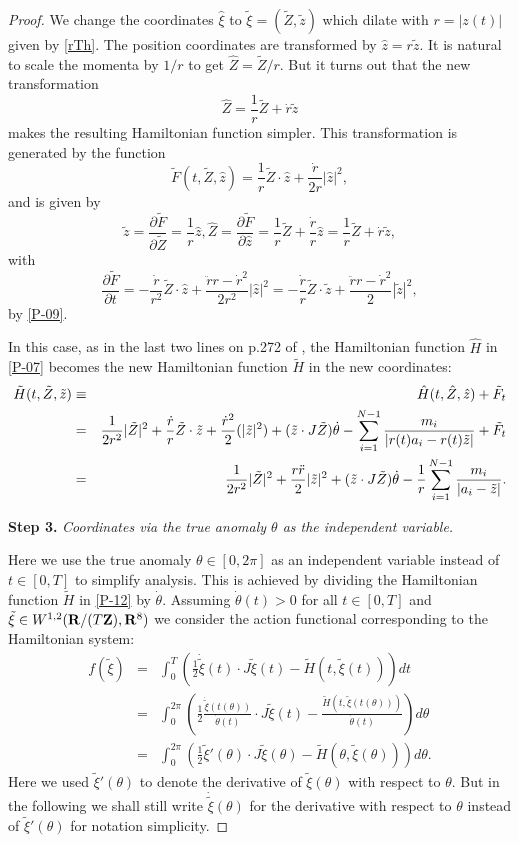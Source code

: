 \documentclass[11pt]{article}
\def\be{\begin{equation}}
\def\ee{\end{equation}}
\def\bea{\begin{eqnarray}}
\def\eea{\end{eqnarray}}
\def\nn{\nonumber}
\def\lb{\label}
\def\pt{\partial}
\def\R{{\bf R}}
\def\Z{{\bf Z}}
\def\th{{\theta}}
\def\td#1{\tilde{#1}}
\begin{document}
\begin{proof}
  We change the coordinates $\hat{\xi}$ to
  $\td{\xi}=(\td{Z},\td{z})$
  which dilate with $r=|z(t)|$ given by \eqref{rTh}. The position coordinates are transformed by $\hat{z} = r\td{z}$.
  It is natural to scale the momenta by $1/r$ to get $\hat{Z}=\td{Z}/r$. 
  But it
  turns out that the new transformation
  \be  \hat{Z}=\frac{1}{r}\td{Z}+\dot{r}\td{z}  \lb{P-09}\ee
  makes the resulting Hamiltonian function simpler. 
  This transformation is generated by the function
  \be  \td{F}(t, \td{Z}, \hat{z})
    = \frac{1}{r}\td{Z}\cdot\hat{z} + \frac{\dot{r}}{2r}|\hat{z}|^2,
                          \lb{P-10}\ee
  and is given by
  \be
  \td{z} = \frac{\pt \td{F}}{\pt \td{Z}} = \frac{1}{r}\hat{z},   
  \hat{Z} = \frac{\pt \td{F}}{\pt \hat{z}} = \frac{1}{r}\td{Z}+\frac{\dot{r}}{r}\hat{z} = \frac{1}{r}\td{Z}+\dot{r}\td{z}, \nn\ee
  with
  \be  \frac{\pt \td{F}}{\pt t}
  = -\frac{\dot{r}}{r^2}\td{Z}\cdot\hat{z}
         + \frac{\ddot{r}r-\dot{r}^2}{2r^2}|\hat{z}|^2
  = -\frac{\dot{r}}{r}\td{Z}\cdot\td{z}
         + \frac{\ddot{r}r-\dot{r}^2}{2}|\td{z}|^2,     \lb{P-11}\ee
  by \eqref{P-09}.
  
  In this case, as in the last two lines on p.272 of \cite{MS}, the
  Hamiltonian function $\hat{H}$ in \eqref{P-07}
  becomes the new Hamiltonian function $\td{H}$ in the new coordinates:
  \bea
  \td{H}(t,\td{Z},\td{z})
  &\equiv& \hat{H}(t, \hat{Z}, \hat{z}) + \td{F}_t \nn\\
  &=& \frac{1}{2r^2}|\td{Z}|^2 + \frac{\dot{r}}{r}\td{Z}\cdot\td{z}
     + \frac{\dot{r}^2}{2}(|\td{z}|^2) + (\td{z}\cdot J\td{Z})\dot{\th}
     - \sum_{i=1}^{N-1}{m_i\over|r(t)a_i-r(t)\tilde{z}|} + \tilde{F}_t   \nn\\
  &=& \frac{1}{2r^2}|\td{Z}|^2+ \frac{r\ddot{r}}{2}|\td{z}|^2
     +(\td{z}\cdot J\td{Z})\dot{\th}
     - \frac{1}{r}\sum_{i=1}^{N-1}{m_i\over|a_i-\tilde{z}|}.   \lb{P-12}\eea
  
  
  {\bf Step 3.} {\it Coordinates via the true anomaly $\th$ as the independent variable.}
  
  Here we use the true anomaly $\th\in [0,2\pi]$ as an independent variable instead of $t\in [0,T]$ to simplify
  analysis. This is achieved by dividing the Hamiltonian function $\td{H}$ in \eqref{P-12} by $\dot{\th}$. Assuming
  $\dot{\th}(t)>0$ for all $t\in [0,T]$ and  $\td{\xi}\in W^{1,2}(\R/(T\Z), \R^8)$ we consider the action functional
  corresponding to the Hamiltonian system:
  \bea f(\td{\xi})
  &=& \int_0^T(\frac{1}{2}\dot{\td{\xi}}(t)\cdot J\td{\xi}(t) - \td{H}(t,\td{\xi}(t))) dt  \nn\\
  &=& \int_0^{2\pi}\left(\frac{1}{2}\frac{\dot{\td{\xi}}(t(\th))}{\dot{\th}(t)}\cdot J\td{\xi}(t)
            - \frac{\td{H}(t,\td{\xi}(t(\th)))}{\dot{\th}(t)}\right) d\th  \nn\\
  &=& \int_0^{2\pi}\left(\frac{1}{2}\td{\xi}'(\th)\cdot J\td{\xi}(\th) - \td{H}(\th,\td{\xi}(\th))\right) d\th.  \nn\eea
  Here we used $\td{\xi}'(\th)$ to denote the derivative of $\td{\xi}(\th)$ with respect to $\th$. But
  in the following we shall still write $\dot{\td{\xi}}(\th)$ for the derivative with respect to $\th$ instead of
  $\td{\xi}'(\th)$ for notation simplicity.
  

\end{proof}
\end{document}
